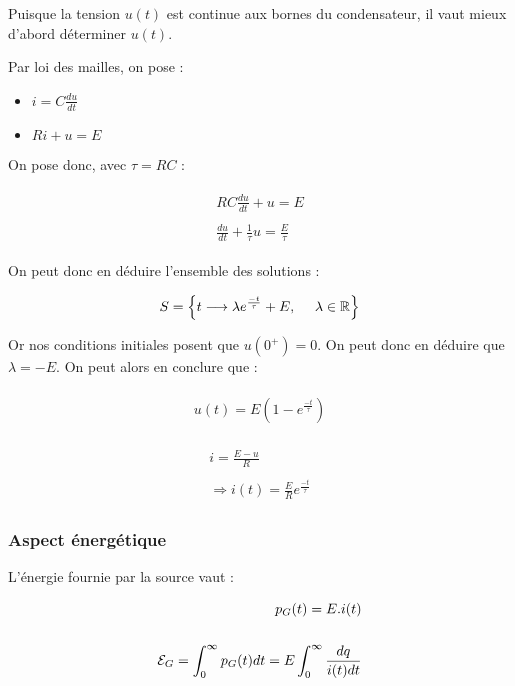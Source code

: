 \documentclass{article}
\begin{document}
Puisque la tension $u(t)$ est continue aux bornes du condensateur, il vaut mieux d'abord déterminer $u(t)$.


Par loi des mailles, on pose :

\begin{itemize}
    \item $i=C\frac{du}{dt}$
    \item $Ri+u=E$
\end{itemize}

On pose donc, avec $\tau=RC$ :

\begin{align*}\begin{split}
RC\frac{du}{dt}+u=E\\\\
\frac{du}{dt}+\frac{1}{\tau}u=\frac{E}{\tau}
\end{split}\end{align*}

On peut donc en déduire l'ensemble des solutions :

\begin{align*}\begin{split}
S=\Bigl\{t\longrightarrow\lambda e^{\frac{-t}{\tau}} + E, ~~~~\lambda\in\mathbb{R}\Bigl\}
\end{split}\end{align*}


Or nos conditions initiales posent que $u(0^+)=0$. On peut donc en déduire que $\lambda=-E$. On peut alors en conclure que :


\begin{align*}\begin{split}
\boxed{u(t)=E(1-e^{\frac{-t}{\tau}})}
\end{split}\end{align*}

\begin{align*}\begin{split}
i=\frac{E-u}{R}\\\\
\Longrightarrow \boxed{i(t)=\frac{E}{R}e^{\frac{-t}{\tau}}}
\end{split}\end{align*}

\subsubsection{Aspect énergétique}

L'énergie fournie par la source vaut :


\begin{align*}\begin{split}
p_G(t)=E.i(t)\\\\
\mathcal{E}_G=\int_{0}^{\infty}p_G(t)dt = E\int_{0}^{\infty}\frac{dq}{i(t)dt}
\end{split}\end{align*}
\end{document}
